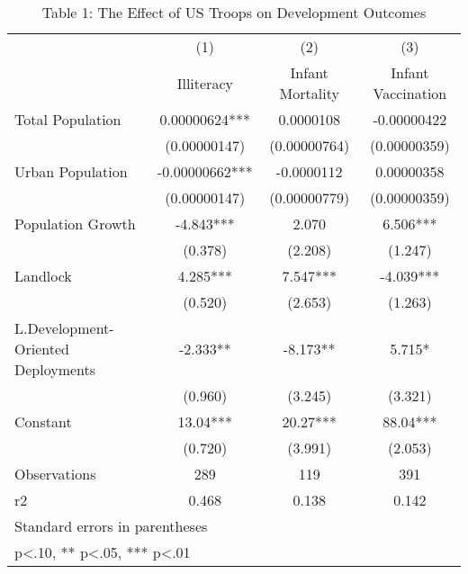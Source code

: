 \begin{table}[htbp]\centering
\def\sym#1{\ifmmode^{#1}\else\(^{#1}\)\fi}
\caption{Table 1: The Effect of US Troops on Development Outcomes}
\begin{tabular}{l*{3}{c}}
\hline\hline
                    &\multicolumn{1}{c}{(1)}&\multicolumn{1}{c}{(2)}&\multicolumn{1}{c}{(3)}\\
                    &\multicolumn{1}{c}{Illiteracy}&\multicolumn{1}{c}{Infant Mortality}&\multicolumn{1}{c}{Infant Vaccination}\\
\hline
Total Population    &  0.00000624***&   0.0000108   & -0.00000422   \\
                    &(0.00000147)   &(0.00000764)   &(0.00000359)   \\
[1em]
Urban Population    & -0.00000662***&  -0.0000112   &  0.00000358   \\
                    &(0.00000147)   &(0.00000779)   &(0.00000359)   \\
[1em]
Population Growth   &      -4.843***&       2.070   &       6.506***\\
                    &     (0.378)   &     (2.208)   &     (1.247)   \\
[1em]
Landlock            &       4.285***&       7.547***&      -4.039***\\
                    &     (0.520)   &     (2.653)   &     (1.263)   \\
[1em]
L.Development-Oriented Deployments&      -2.333** &      -8.173** &       5.715*  \\
                    &     (0.960)   &     (3.245)   &     (3.321)   \\
[1em]
Constant            &       13.04***&       20.27***&       88.04***\\
                    &     (0.720)   &     (3.991)   &     (2.053)   \\
\hline
Observations        &         289   &         119   &         391   \\
r2                  &       0.468   &       0.138   &       0.142   \\
\hline\hline
\multicolumn{4}{l}{\footnotesize Standard errors in parentheses}\\
\multicolumn{4}{l}{\footnotesize * p<.10, ** p<.05, *** p<.01}\\
\end{tabular}
\end{table}
